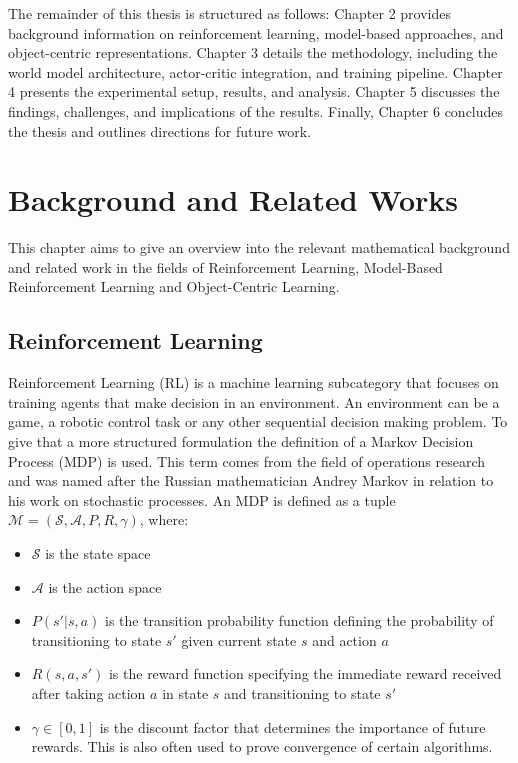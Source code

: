 \documentclass[
	english,
	ruledheaders=section,
	class=report,
	thesis={type=master},
	accentcolor=9c,
	custommargins=true,
	marginpar=false,
	parskip=half-,
	fontsize=11pt,
]{tudapub}
\begin{document}
The remainder of this thesis is structured as follows: Chapter 2 provides
background information on reinforcement learning, model-based approaches, and
object-centric representations. Chapter 3 details the methodology, including
the world model architecture, actor-critic integration, and training pipeline.
Chapter 4 presents the experimental setup, results, and analysis. Chapter 5
discusses the findings, challenges, and implications of the results. Finally,
Chapter 6 concludes the thesis and outlines directions for future work.

\chapter{Background and Related Works}
\label{chap:background}
This chapter aims to give an overview into the relevant mathematical background and related work
in the fields of Reinforcement Learning, Model-Based Reinforcement Learning and Object-Centric Learning.
\section{Reinforcement Learning}
\label{sec:reinforcement_learning}

Reinforcement Learning (RL) is a machine learning subcategory that focuses on
training agents that make decision in an environment. An environment can be a
game, a robotic control task or any other sequential decision making problem.
To give that a more structured formulation the definition of a Markov Decision
Process (MDP) is used. This term comes from the field of operations research
and was named after the Russian mathematician Andrey Markov in relation to his
work on stochastic processes. An MDP is defined as a tuple $\mathcal{M} =
	(\mathcal{S}, \mathcal{A}, P, R, \gamma)$, where:

\begin{itemize}
	\item $\mathcal{S}$ is the state space
	\item $\mathcal{A}$ is the action space
	\item $P(s'|s,a)$ is the transition probability function defining the probability of transitioning to state $s'$ given current state $s$ and action $a$
	\item $R(s,a,s')$ is the reward function specifying the immediate reward received after taking action $a$ in state $s$ and transitioning to state $s'$
	\item $\gamma \in [0,1]$ is the discount factor that determines the importance of future rewards. This is also often used to prove convergence of certain algorithms.
\end{itemize}
\end{document}
